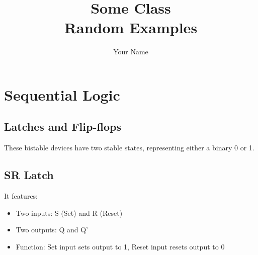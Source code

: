 \documentclass[12pt]{report}
\title{\Huge{Some Class}\\Random Examples}
\author{\huge{Your Name}}
\date{}
\begin{document}
\chapter{Sequential Logic}

\section{Latches and Flip-flops}
These bistable devices have two stable states, representing either a binary 0 or 1.

\section{SR Latch}
 It features:
\begin{itemize}
    \item Two inputs: S (Set) and R (Reset)
    \item Two outputs: Q and Q'
    \item Function: Set input sets output to 1, Reset input resets output to 0
\end{itemize}
\end{document}
